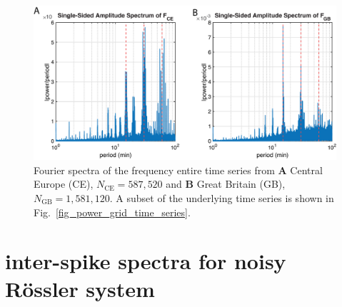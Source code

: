 \documentclass[entropy,article,submit,pdftex,moreauthors]{Definitions/mdpi}
\begin{document}
\begin{figure}
 \centering
 \includegraphics[width=\textwidth]{./figures/fig_power_grid_fft_full}
 \caption{Fourier spectra of the frequency entire time series from \textbf{A} Central Europe (CE), $N_{\text{CE}}=587,520$ and \textbf{B} Great Britain (GB), $N_{\text{GB}}=1,581,120$. A subset of the underlying time series is shown in Fig.~\ref{fig_power_grid_time_series}.}
\label{fig_power_grid_fft_full}
\end{figure}

\clearpage

\section{inter-spike spectra for noisy R\"ossler system}
\end{document}
